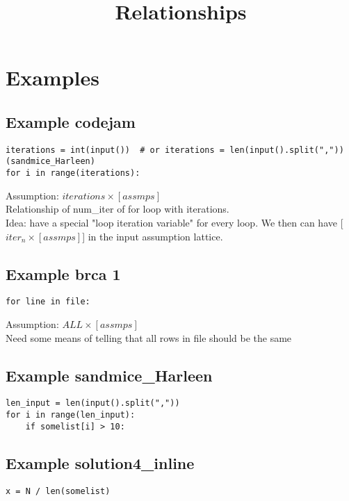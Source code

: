 \documentclass[11pt]{article}
\begin{document}
\title{Relationships}

\maketitle


\section{Examples}


\subsection{Example codejam}
\begin{lstlisting}
iterations = int(input())  # or iterations = len(input().split(",")) (sandmice_Harleen)
for i in range(iterations):  
\end{lstlisting}


Assumption: $iterations \times [assmps]$\\

Relationship of num\_iter of for loop with iterations. \\
Idea: have a special "loop iteration variable" for every loop. We then can have [$iter_n\times[assmps]$] in the input assumption lattice. \\



\subsection{Example brca 1}
\begin{lstlisting}
for line in file:
\end{lstlisting}


Assumption: $ALL \times [assmps]$\\

Need some means of telling that all rows in file should be the same\\


\subsection{Example sandmice_Harleen}
\begin{lstlisting}
len_input = len(input().split(","))
for i in range(len_input):
    if somelist[i] > 10:
\end{lstlisting}


\subsection{Example solution4_inline}
\begin{lstlisting}
x = N / len(somelist)
\end{lstlisting}
\end{document}
